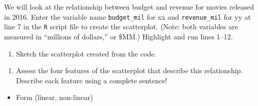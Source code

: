 \documentclass[
]{report}
\newenvironment{Shaded}{\begin{snugshade}}{\end{snugshade}}
\newcommand{\AttributeTok}[1]{\textcolor[rgb]{0.77,0.63,0.00}{#1}}
\newcommand{\CommentTok}[1]{\textcolor[rgb]{0.56,0.35,0.01}{\textit{#1}}}
\newcommand{\ConstantTok}[1]{\textcolor[rgb]{0.00,0.00,0.00}{#1}}
\newcommand{\FunctionTok}[1]{\textcolor[rgb]{0.00,0.00,0.00}{#1}}
\newcommand{\NormalTok}[1]{#1}
\newcommand{\SpecialCharTok}[1]{\textcolor[rgb]{0.00,0.00,0.00}{#1}}
\newcommand{\StringTok}[1]{\textcolor[rgb]{0.31,0.60,0.02}{#1}}
\providecommand{\tightlist}{%
  \setlength{\itemsep}{0pt}\setlength{\parskip}{0pt}}
\begin{document}
\vspace{0.4in}

We will look at the relationship between budget and revenue for movies released in 2016. Enter the variable name \texttt{budget\_mil} for xx and \texttt{revenue\_mil} for yy at line 7 in the \texttt{R} script file to create the scatterplot. (Note: both variables are measured in ``millions of dollars,'' or \$MM.) Highlight and run lines 1--12.

\begin{Shaded}
\end{Shaded}

\begin{enumerate}
\def\labelenumi{\arabic{enumi}.}
\setcounter{enumi}{2}
\tightlist
\item
  Sketch the scatterplot created from the code.
\end{enumerate}

\vspace{2in}

\begin{enumerate}
\def\labelenumi{\arabic{enumi}.}
\setcounter{enumi}{3}
\tightlist
\item
  Assess the four features of the scatterplot that describe this relationship. Describe each feature using a complete sentence!
\end{enumerate}

\begin{itemize}
\tightlist
\item
  Form (linear, non-linear)
\end{itemize}
\end{document}

